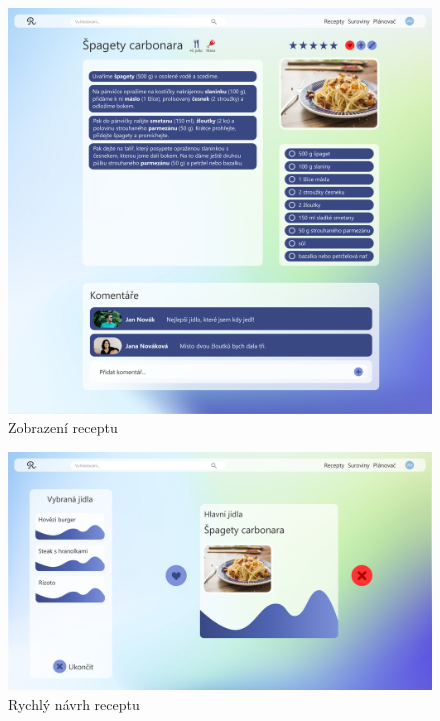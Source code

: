\vspace*{\fill}
\begin{figure}[H]
    \includegraphics[width=\textwidth]{pdf/adobexd/zobrazeni-receptu}
    \caption{Zobrazení receptu} \label{picture:recipeo:navrh:zobrazeni-receptu}
\end{figure}
\vspace*{\fill}
\clearpage

\vspace*{\fill}
\begin{figure}[H]
    \includegraphics[width=\textwidth]{pdf/adobexd/navrh-jidla}
    \caption{Rychlý návrh receptu} \label{picture:recipeo:navrh:rychly-navrh}
\end{figure}

